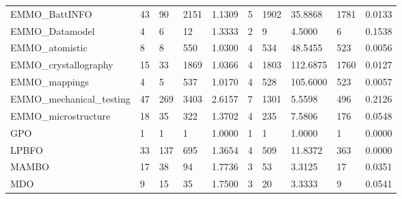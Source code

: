 \begin{tabular}{llllllllll}
EMMO\_BattINFO           &                         43 &                         90 &            2151 &         1.1309 &              5 &              1902 &          35.8868 &             1781 &       0.0133 \\
EMMO\_Datamodel          &                          4 &                          6 &              12 &         1.3333 &              2 &                 9 &           4.5000 &                6 &       0.1538 \\
EMMO\_atomistic          &                          8 &                          8 &             550 &         1.0300 &              4 &               534 &          48.5455 &              523 &       0.0056 \\
EMMO\_crystallography    &                         15 &                         33 &            1869 &         1.0366 &              4 &              1803 &         112.6875 &             1760 &       0.0127 \\
EMMO\_mappings           &                          4 &                          5 &             537 &         1.0170 &              4 &               528 &         105.6000 &              523 &       0.0057 \\
EMMO\_mechanical\_testing &                         47 &                        269 &            3403 &         2.6157 &              7 &              1301 &           5.5598 &              496 &       0.2126 \\
EMMO\_microstructure     &                         18 &                         35 &             322 &         1.3702 &              4 &               235 &           7.5806 &              176 &       0.0548 \\
GPO                     &                          1 &                          1 &               1 &         1.0000 &              1 &                 1 &           1.0000 &                1 &       0.0000 \\
LPBFO                   &                         33 &                        137 &             695 &         1.3654 &              4 &               509 &          11.8372 &              363 &       0.0000 \\
MAMBO                   &                         17 &                         38 &              94 &         1.7736 &              3 &                53 &           3.3125 &               17 &       0.0351 \\
MDO                     &                          9 &                         15 &              35 &         1.7500 &              3 &                20 &           3.3333 &                9 &       0.0541 \\

\end{tabular}
